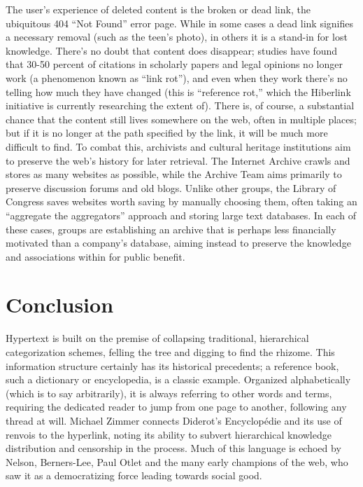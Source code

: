The user's experience of deleted content is the broken or dead link, the ubiquitous 404 ``Not Found'' error page. While in some cases a dead link signifies a necessary removal (such as the teen's photo), in others it is a stand-in for lost knowledge. There's no doubt that content does disappear; studies have found that 30-50 percent of citations in scholarly papers and legal opinions no longer work (a phenomenon known as ``link rot''), and even when they work there's no telling how much they have changed (this is ``reference rot,'' which the Hiberlink initiative is currently researching the extent of).  There is, of course, a substantial chance that the content still lives somewhere on the web, often in multiple places; but if it is no longer at the path specified by the link, it will be much more difficult to find. To combat this, archivists and cultural heritage institutions aim to preserve the web's history for later retrieval. The Internet Archive crawls and stores as many websites as possible, while the Archive Team aims primarily to preserve discussion forums and old blogs. Unlike other groups, the Library of Congress saves websites worth saving by manually choosing them, often taking an ``aggregate the aggregators'' approach and storing large text databases. In each of these cases, groups are establishing an archive that is perhaps less financially motivated than a company's database, aiming instead to preserve the knowledge and associations within for public benefit.

\section{Conclusion}

Hypertext is built on the premise of collapsing traditional, hierarchical categorization schemes, felling the tree and digging to find the rhizome. This information structure certainly has its historical precedents; a reference book, such a dictionary or encyclopedia, is a classic example. Organized alphabetically (which is to say arbitrarily), it is always referring to other words and terms, requiring the dedicated reader to jump from one page to another, following any thread at will. Michael Zimmer connects Diderot's Encyclopédie and its use of renvois to the hyperlink, noting its ability to subvert hierarchical knowledge distribution and censorship in the process.  Much of this language is echoed by Nelson, Berners-Lee, Paul Otlet and the many early champions of the web, who saw it as a democratizing force leading towards social good.

